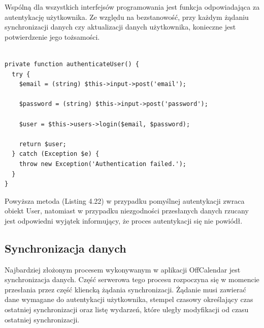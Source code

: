 Wspólną dla wszystkich interfejsów programowania jest funkcja odpowiadająca za autentykację użytkownika. Ze względu na bezstanowość, przy każdym żądaniu synchronizacji danych czy aktualizacji danych użytkownika, konieczne jest potwierdzenie jego tożsamości.

\begin{lstlisting}[caption=Rejestracja użytkowników przy użyciu metody register interfejsu Users\_api., label=amb, captionpos=b]

private function authenticateUser() {
  try {
	$email = (string) $this->input->post('email');

	$password = (string) $this->input->post('password');

	$user = $this->users->login($email, $password);

    return $user;
  } catch (Exception $e) {
	throw new Exception('Authentication failed.');
  }
}

\end{lstlisting}

Powyższa metoda (Listing 4.22) w przypadku pomyślnej autentykacji zwraca obiekt User, natomiast w przypadku niezgodności przesłanych danych rzucany jest odpowiedni wyjątek informujący, że proces autentykacji się nie powiódł.

\subsection{Synchronizacja danych}
\label{serwSynDanych}

Najbardziej złożonym procesem wykonywanym w aplikacji OffCalendar jest synchronizacja danych. Część serwerowa tego procesu rozpoczyna się w momencie przesłania przez część kliencką żądania synchronizacji. Żądanie musi zawierać dane wymagane do autentykacji użytkownika, stempel czasowy określający czas ostatniej synchronizacji oraz listę wydarzeń, które uległy modyfikacji od czasu ostatniej synchronizacji.

